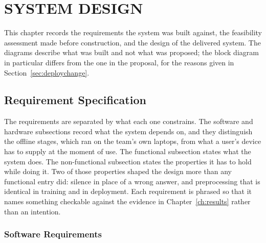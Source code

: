 \chapter{SYSTEM DESIGN}
\label{ch:systemdesign}

This chapter records the requirements the system was built against, the feasibility assessment made before construction, and the design of the delivered system. The diagrams describe what was built and not what was proposed; the block diagram in particular differs from the one in the proposal, for the reasons given in Section~\ref{sec:deploychange}.

\section{Requirement Specification}

The requirements are separated by what each one constrains. The software and hardware subsections record what the system depends on, and they distinguish the offline stages, which ran on the team's own laptops, from what a user's device has to supply at the moment of use. The functional subsection states what the system does. The non-functional subsection states the properties it has to hold while doing it. Two of those properties shaped the design more than any functional entry did: silence in place of a wrong answer, and preprocessing that is identical in training and in deployment. Each requirement is phrased so that it names something checkable against the evidence in Chapter~\ref{ch:results} rather than an intention.

\subsection{Software Requirements}

